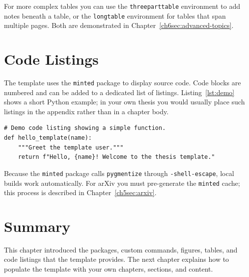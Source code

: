 For more complex tables you can use the \texttt{threeparttable} environment to add notes beneath a table, or the \texttt{longtable} environment for tables that span multiple pages. Both are demonstrated in Chapter~\ref{ch6sec:advanced-topics}.


\section{Code Listings}\label{ch2sec:listings}

The template uses the \texttt{minted} package to display source code. Code blocks are numbered and can be added to a dedicated list of listings. Listing~\ref{lst:demo} shows a short Python example; in your own thesis you would usually place such listings in the appendix rather than in a chapter body.

\begin{listing}[ht]
\begin{verbatim}
# Demo code listing showing a simple function.
def hello_template(name):
    """Greet the template user."""
    return f"Hello, {name}! Welcome to the thesis template."
\end{verbatim}
\caption{Demo Python function using the \texttt{minted} package.}\label{lst:demo}
\end{listing}

Because the \texttt{minted} package calls \texttt{pygmentize} through \texttt{-shell-escape}, local builds work automatically. For arXiv you must pre-generate the \texttt{minted} cache; this process is described in Chapter~\ref{ch5sec:arxiv}.


\section{Summary}\label{ch2sec:summary}

This chapter introduced the packages, custom commands, figures, tables, and code listings that the template provides. The next chapter explains how to populate the template with your own chapters, sections, and content.
